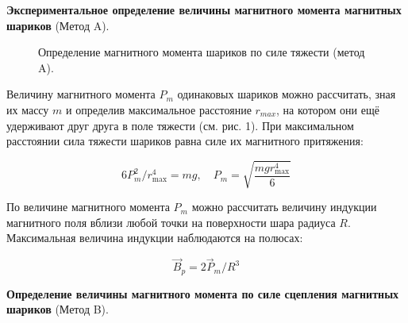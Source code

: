 \documentclass[a4paper, 12pt]{article}
\begin{document}
\textbf{
Экспериментальное определение величины магнитного момента магнитных шариков} (Метод A).

\begin{figure}[h]
\caption{Определение магнитного момента шариков по силе тяжести (метод A).}
\label{ris:image}
\end{figure}

Величину магнитного момента $P_m$ одинаковых шариков можно рассчитать, зная их массу $m$ и определив максимальное расстояние $r_{max}$, на котором они ещё удерживают друг друга в поле тяжести (см. рис. 1). При максимальном расстоянии сила тяжести шариков равна силе их магнитного притяжения:

  \begin{center}
\begin{equation}
6 P_{m}^{2} / r_{\max }^{4}=m g, \quad P_{m}=\sqrt{\frac{m g r_{\max }^{4}}{6}}\end{equation}
\end{center}

По величине магнитного момента $P_m$ можно рассчитать величину индукции магнитного поля вблизи любой точки на поверхности шара радиуса $R$. Максимальная величина индукции наблюдаются на полюсах:

  \begin{center}
\begin{equation}
\vec{B}_{p}=2 \vec{P}_{m} / R^{3}
\end{equation}
\end{center}

\textbf{
Определение величины магнитного момента по силе сцепления магнитных шариков} (Метод B).
\end{document}
